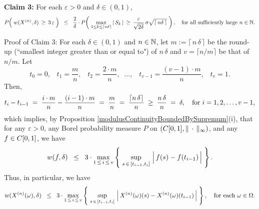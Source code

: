 \vskip 0.5cm
\begin{center}
\begin{minipage}{6.5in}
\noindent
\textbf{Claim 3:}\quad
For each $\varepsilon > 0$ and $\delta \in (0,1)$,
\begin{equation*}
P\!\left(\; w(X^{(n)},\delta) \,\overset{{\color{white}.}}{\geq}\, 3\,\varepsilon \;\right)
\;\; \leq \;\;	\dfrac{2}{\delta}\cdot
	P\!\left(\;
		\underset{1 \leq k\leq\lceil n\delta \rceil}{\max}\,\vert\,S_{k}\,\vert
		\,\overset{{\color{white}.}}{\geq}\,
		\dfrac{\varepsilon}{\sqrt{2\delta}}\,\sigma\sqrt{\lceil\,n\delta\,\rceil} 
	\;\right),
	\quad\textnormal{for all sufficiently large $n \in \N$}.
\end{equation*}
\end{minipage}
\end{center}
Proof of Claim 3:\quad
For each $\delta \in (0,1)$ and $n \in \mathbb{N}$,
let $m := \lceil\,n\,\delta\,\rceil$ be the round-up (``smallest integer greater than or equal to") of $n\,\delta$
and $v = \lceil n/m \rceil$ be that of $n / m$. Let
\begin{equation*}
t_{0} = 0,
\;\;\; t_{1} = \dfrac{m}{n},
\;\;\; t_{2} = \dfrac{2\cdot m}{n},
\;\;\ldots,
\;\;\; t_{v-1} = \dfrac{(v-1)\cdot m}{n},
\;\;\; t_{v} = 1.
\end{equation*}
Then,
\begin{equation*}
t_{i} - t_{i-1}
\;=\; \dfrac{i\cdot m}{n} - \dfrac{(i-1)\cdot m}{n}
\;=\; \dfrac{m}{n}
\;=\; \dfrac{\lceil n\,\delta \rceil}{n}
\;\geq\; \dfrac{n\,\delta}{n}
\;=\; \delta,
\quad
\textnormal{for $i = 1, 2, \ldots, v-1$,}
\end{equation*}
which implies, by Proposition \ref{modulusContinuityBoundedBySupremum}(i),
that for any $\varepsilon > 0$, any Borel probability measure $P$ on
$\left(C[0,1],\Vert\,\cdot\,\Vert_{\infty}\right)$, and any $f \in C[0,1]$, we have
\begin{equation*}
	w(f,\delta) \;\; \leq \;\; 3 \cdot
	\max_{1\,\leq\,i\,\leq\,v}\left\{\;
	\sup_{s\,\in\,[t_{i-1},t_{i}]}\,\left\vert\,\overset{{\color{white}.}}{f}(s) - f(t_{i-1})\,\right\vert
	\;\right\}.
\end{equation*}
Thus, in particular, we have
\begin{equation*}
	w(X^{(n)}(\omega),\delta) \;\; \leq \;\; 3 \cdot
	\max_{1\,\leq\,i\,\leq\,v}\left\{\;
	\sup_{s\,\in\,[t_{i-1},t_{i}]}\,\left\vert\,X^{(n)}(\omega)(s) \overset{{\color{white}.}}{-} X^{(n)}(\omega)(t_{i-1})\,\right\vert
	\;\right\},
	\quad
	\textnormal{for each $\omega \in \Omega$.}
\end{equation*}
